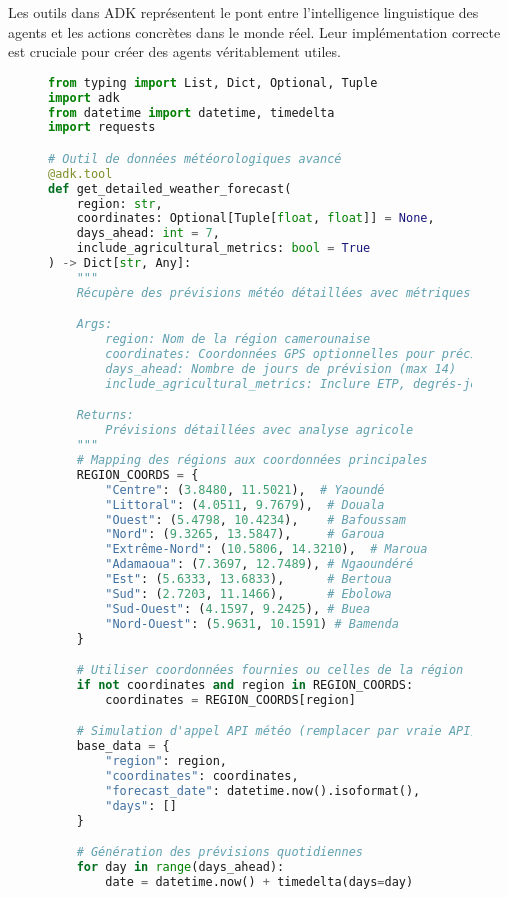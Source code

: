 Les outils dans ADK représentent le pont entre l'intelligence linguistique des agents et les actions concrètes dans le monde réel. Leur implémentation correcte est cruciale pour créer des agents véritablement utiles.

\begin{figure}[h]
\centering
\begin{lstlisting}[language=Python, caption=Implémentation d'outils spécialisés pour l'agriculture]
from typing import List, Dict, Optional, Tuple
import adk
from datetime import datetime, timedelta
import requests

# Outil de données météorologiques avancé
@adk.tool
def get_detailed_weather_forecast(
    region: str,
    coordinates: Optional[Tuple[float, float]] = None,
    days_ahead: int = 7,
    include_agricultural_metrics: bool = True
) -> Dict[str, Any]:
    """
    Récupère des prévisions météo détaillées avec métriques agricoles.

    Args:
        region: Nom de la région camerounaise
        coordinates: Coordonnées GPS optionnelles pour précision
        days_ahead: Nombre de jours de prévision (max 14)
        include_agricultural_metrics: Inclure ETP, degrés-jours, etc.

    Returns:
        Prévisions détaillées avec analyse agricole
    """
    # Mapping des régions aux coordonnées principales
    REGION_COORDS = {
        "Centre": (3.8480, 11.5021),  # Yaoundé
        "Littoral": (4.0511, 9.7679),  # Douala
        "Ouest": (5.4798, 10.4234),    # Bafoussam
        "Nord": (9.3265, 13.5847),     # Garoua
        "Extrême-Nord": (10.5806, 14.3210),  # Maroua
        "Adamaoua": (7.3697, 12.7489), # Ngaoundéré
        "Est": (5.6333, 13.6833),      # Bertoua
        "Sud": (2.7203, 11.1466),      # Ebolowa
        "Sud-Ouest": (4.1597, 9.2425), # Buea
        "Nord-Ouest": (5.9631, 10.1591) # Bamenda
    }

    # Utiliser coordonnées fournies ou celles de la région
    if not coordinates and region in REGION_COORDS:
        coordinates = REGION_COORDS[region]

    # Simulation d'appel API météo (remplacer par vraie API)
    base_data = {
        "region": region,
        "coordinates": coordinates,
        "forecast_date": datetime.now().isoformat(),
        "days": []
    }

    # Génération des prévisions quotidiennes
    for day in range(days_ahead):
        date = datetime.now() + timedelta(days=day)


\end{lstlisting}
\end{figure}
